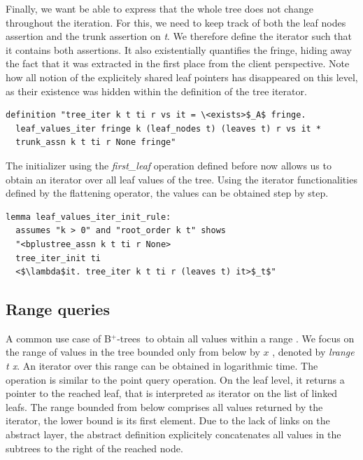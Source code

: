 \documentclass[a4paper,UKenglish,cleveref, autoref, thm-restate]{lipics-v2021}
\newcommand{\btrees}{B$^+$-trees}
\begin{document}
Finally, we want be able to express that the whole tree does not change throughout the iteration.
For this, we need to keep track of both the leaf nodes assertion and the trunk assertion on \emph{t}.
We therefore define the iterator such that it contains both assertions.
It also existentially quantifies the fringe, hiding away
the fact that it was extracted in the first place from the client perspective.
Note how all notion of the explicitely shared leaf pointers
has disappeared on this level, as their existence was hidden within the definition
of the tree iterator.


\begin{lstlisting}[mathescape=true, language=Isabelle,label=lst:btree-tree-iter]
definition "tree_iter k t ti r vs it = \<exists>$_A$ fringe.
  leaf_values_iter fringe k (leaf_nodes t) (leaves t) r vs it *
  trunk_assn k t ti r None fringe"
\end{lstlisting}

The initializer using the \emph{first\_leaf} operation
defined before now allows us to obtain an iterator over all leaf
values of the tree.
Using the iterator functionalities defined by the flattening operator,
the values can be obtained step by step.

\begin{lstlisting}
lemma leaf_values_iter_init_rule:
  assumes "k > 0" and "root_order k t" shows
  "<bplustree_assn k t ti r None>
  tree_iter_init ti
  <$\lambda$it. tree_iter k t ti r (leaves t) it>$_t$"
\end{lstlisting}



\subsection{Range queries}
\label{sec:imperative_range}

A common use case of \btrees\ 
to obtain all values within a range \cite{DBLP:journals/ftdb/Graefe11}.
We focus on the range of values in the tree bounded only from below by $x$
, denoted by \emph{lrange t x}.
An iterator over this range can be obtained in logarithmic time.
The operation is similar to the point query operation.
On the leaf level, it returns a pointer to the
reached leaf, that is interpreted as iterator on the list of linked leafs.
The range bounded from below comprises all values returned by the iterator,
the lower bound is its first element.
Due to the lack of links on the abstract layer,
the abstract definition explicitely concatenates all values in the subtrees 
to the right of the reached node.
\end{document}
